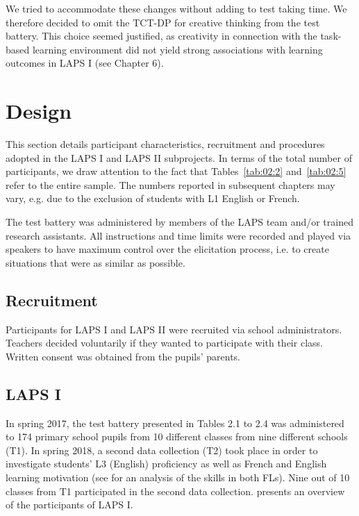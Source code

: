 \documentclass[output=paper]{langsci/langscibook}
\begin{document}
We tried to accommodate these changes without adding to test taking time. We therefore decided to omit the TCT-DP for creative thinking from the test battery. This choice seemed justified, as creativity in connection with the task-based learning environment did not yield strong associations with learning outcomes in LAPS I (see Chapter 6). 

\section{Design}\label{sec:02:4}
\begin{sloppypar}
This section details participant characteristics, recruitment and procedures adopted in the LAPS I and LAPS II subprojects. In terms of the total number of participants, we draw attention to the fact that Tables~\ref{tab:02:2} and~\ref{tab:02:5} refer to the entire sample. The numbers reported in subsequent chapters may vary, e.g. due to the exclusion of students with L1 English or French. 

The test battery was administered by members of the LAPS team and/or trained research assistants. All instructions and time limits were recorded and played via speakers to have maximum control over the elicitation process, i.e. to create situations that were as similar as possible. 
\end{sloppypar}

 \subsection{Recruitment}


Participants for LAPS I and LAPS II were recruited via school administrators. Teachers decided voluntarily if they wanted to participate with their class. Written consent was obtained from the pupils’ parents. 

 \subsection{LAPS I}


In spring 2017, the test battery presented in Tables 2.1 to 2.4 was administered to 174 primary school pupils from 10 different classes from nine different schools (T1). In spring 2018, a second data collection (T2) took place in order to investigate students’ L3 (English) proficiency as well as French and English learning motivation (see \citealt{BertheleUdry2019} for an analysis of the skills in both FLs). Nine out of 10 classes from T1 participated in the second data collection.  presents an overview of the participants of LAPS I.
\end{document}
